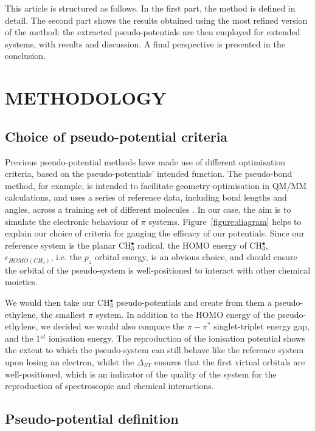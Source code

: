 \documentclass[12pt]{article}
\begin{document}
This article is structured as follows.
In the first part, the method is defined in detail.
The second part shows the results obtained using the most refined version of the method: the extracted pseudo-potentials are then employed for extended systems, with results and discussion. A final perspective is presented in the conclusion.

\section*{\sffamily \Large METHODOLOGY}

\subsection*{\sffamily \large Choice of pseudo-potential criteria \label{section:pseudocrit}} 

Previous pseudo-potential methods have made use of different optimisation criteria, based on the pseudo-potentials' intended function. 
The pseudo-bond method, for example, is intended to facilitate geometry-optimisation in QM/MM calculations, and uses a series of reference data, 
including bond lengths and angles, across a training set of different molecules \cite{zhang_pseudobond_1998}. 
In our case, the aim is to simulate the electronic behaviour of $\pi$ systems.
Figure~\ref{figure:diagram} helps to explain our choice of criteria for gauging the efficacy of our potentials. Since our reference system is the planar CH$_3^\bullet$ radical, the HOMO energy of CH$_3^{\bullet}$, $\epsilon_{HOMO(CH_3)}$, i.e. the $p_{z}$ orbital energy, is an obvious choice, and should ensure the orbital of the pseudo-system is well-positioned to interact with other chemical moieties.

We would then take our CH$_3^{\bullet}$ pseudo-potentials and create from them a pseudo-ethylene, the smallest $\pi$ system.
In addition to the HOMO energy of the pseudo-ethylene, we decided we would also compare the $\pi-\pi^{*}$ singlet-triplet energy gap, 
and the 1$^{st}$ ionisation energy. The reproduction of the ionisation potential shows the extent to which the pseudo-system 
can still behave like the reference system upon losing an electron, whilst the $\Delta_{ST}$ ensures that the first virtual 
orbitals are well-positioned, which is an indicator of the quality of the system for the reproduction of spectroscopic and 
chemical interactions.

\subsection*{\sffamily \large Pseudo-potential definition} \label{secpotdef}
\end{document}
